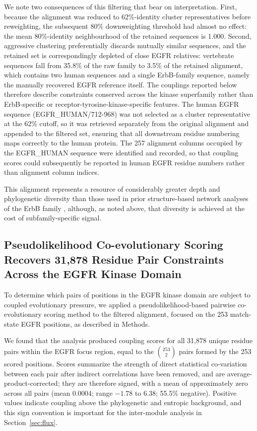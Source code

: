 \documentclass[utf8]{FrontiersinHarvard}
\begin{document}
We note two consequences of this filtering that bear on interpretation. First, because the alignment was reduced to 62\%-identity cluster representatives before reweighting, the subsequent 80\% downweighting threshold had almost no effect: the mean 80\%-identity neighbourhood of the retained sequences is 1.000. Second, aggressive clustering preferentially discards mutually similar sequences, and the retained set is correspondingly depleted of close EGFR relatives: vertebrate sequences fall from 35.8\% of the raw family to 3.5\% of the retained alignment, which contains two human sequences and a single ErbB-family sequence, namely the manually recovered EGFR reference itself. The couplings reported below therefore describe constraints conserved across the kinase superfamily rather than ErbB-specific or receptor-tyrosine-kinase-specific features. The human EGFR sequence (EGFR\_HUMAN/712-968) was not selected as a cluster representative at the 62\% cutoff, so it was retrieved separately from the original alignment and appended to the filtered set, ensuring that all downstream residue numbering maps correctly to the human protein. The 257 alignment columns occupied by the EGFR\_HUMAN sequence were identified and recorded, so that coupling scores could subsequently be reported in human EGFR residue numbers rather than alignment column indices.

This alignment represents a resource of considerably greater depth and phylogenetic diversity than those used in prior structure-based network analyses of the ErbB family \citep{JamesVerkhivker2014}, although, as noted above, that diversity is achieved at the cost of subfamily-specific signal.

\subsection{Pseudolikelihood Co-evolutionary Scoring Recovers 31,878 Residue Pair Constraints Across the EGFR Kinase Domain}

To determine which pairs of positions in the EGFR kinase domain are subject to coupled evolutionary pressure, we applied a pseudolikelihood-based pairwise co-evolutionary scoring method to the filtered alignment, focused on the 253 match-state EGFR positions, as described in Methods.

We found that the analysis produced coupling scores for all 31,878 unique residue pairs within the EGFR focus region, equal to the $\binom{253}{2}$ pairs formed by the 253 scored positions. Scores summarize the strength of direct statistical co-variation between each pair after indirect correlations have been removed, and are average-product-corrected; they are therefore signed, with a mean of approximately zero across all pairs (mean 0.0004; range $-1.78$ to $6.38$; 55.5\% negative). Positive values indicate coupling above the phylogenetic and entropic background, and this sign convention is important for the inter-module analysis in Section~\ref{sec:flux}.
\end{document}
